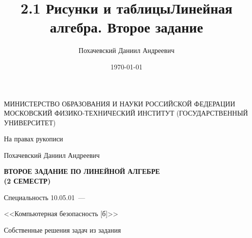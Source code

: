 \documentclass[a4paper,12pt]{report}
\author{Похачевский Даниил Андреевич}
\title{2.1 Рисунки и таблицы}
\date{\today}
\title{Линейная алгебра. Второе задание}
\begin{document}
	
\thispagestyle{empty}%
\begin{center}%
	\MakeUppercase{министерство образования и науки российской федерации московский физико-технический институт (государственный университет)}
\end{center}%
%
\vspace{0pt plus4fill} %
\begin{flushright}%
	На правах рукописи
\end{flushright}%
%
\vspace{0pt plus6fill} %
\begin{center}%
	{\large Похачевский Даниил Андреевич}
\end{center}%
%
\vspace{0pt plus1fill} %
\begin{center}%
	\textbf {\large ВТОРОЕ ЗАДАНИЕ ПО ЛИНЕЙНОЙ АЛГЕБРЕ \\(2 СЕМЕСТР)}
	
	\vspace{0pt plus2fill} %
	{%
		Специальность 10.05.01~---
		
		<<Компьютерная безопасность [б]>>
	}
	
	\vspace{0pt plus2fill} %
	Собственные решения задач из задания
	
\end{center}%
%
\vspace{0pt plus4fill} %
\end{document}
